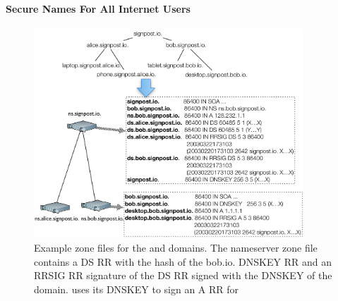\paragraph{Secure Names For All Internet Users}

\begin{figure}
  \centering
    \includegraphics[width=0.9\textwidth]{Chapter3/Chapter3Figs/DNSSEC_hierarchy}
    \caption[Example \dnssec zone files.]{Example \dnssec zone files for the
       and  domains. The 
      nameserver zone file contains a DS RR with the hash of the bob.io.  DNSKEY
      RR and an RRSIG RR signature of the DS RR signed with the DNSKEY of the
       domain.  uses its DNSKEY to sign an A RR for
      }
  \label{fig:dnssec_hierarchy}
\end{figure}

